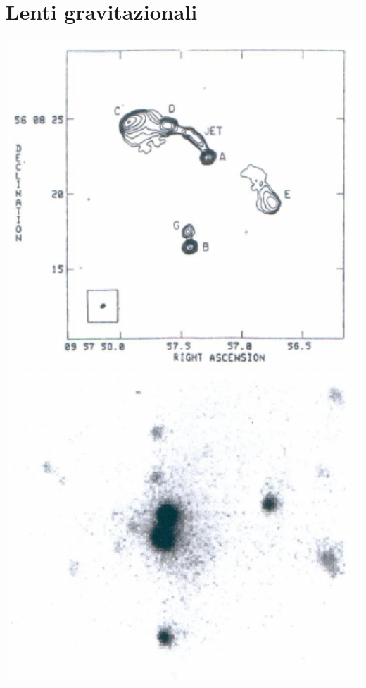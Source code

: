\section{Lenti gravitazionali}
\begin{minipage}{.40\textwidth}
	\centering
	\includegraphics[width=1\textwidth]{Img/bertin_11.png}
	\includegraphics[width=1\textwidth]{Img/bertin_11bis.png}
\end{minipage}
